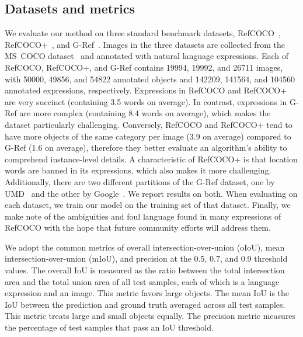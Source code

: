 \documentclass[10pt,twocolumn,letterpaper]{article}
\begin{document}
\subsection{Datasets and metrics}
\label{sec:datasets_and_metrics}
We evaluate our method on three standard benchmark datasets, RefCOCO~\cite{yu2016modeling}, RefCOCO+~\cite{yu2016modeling}, and G-Ref~\cite{mao2015generation,nagaraja16refexp}.
Images in the three datasets are collected from the MS~COCO dataset~\cite{lin2014mscoco} and annotated with natural language expressions.
Each of RefCOCO, RefCOCO+, and G-Ref contains \num{19994}, \num{19992}, and \num{26711} images, with \num{50000}, \num{49856}, and \num{54822} annotated objects and \num{142209}, \num{141564}, and \num{104560} annotated expressions, respectively.
Expressions in RefCOCO and RefCOCO+ are very succinct (containing 3.5 words on average).
In contrast, expressions in G-Ref are more complex (containing 8.4 words on average), which makes the dataset particularly challenging.
Conversely, RefCOCO and RefCOCO+ tend to have more objects of the same category per image (3.9 on average) compared to G-Ref (1.6 on average), therefore they better evaluate an algorithm's ability to comprehend instance-level details.
A characteristic of RefCOCO+ is that location words are banned in its expressions, which also makes it more challenging.
Additionally, there are two different partitions of the G-Ref dataset, one by UMD~\cite{nagaraja16refexp} and the other by Google~\cite{mao2015generation}.
We report results on both.
When evaluating on each dataset, we train our model on the training set of that dataset.
Finally, we make note of the ambiguities and foul language found in many expressions of RefCOCO with the hope that future community efforts will address them.

We adopt the common metrics of overall intersection-over-union (oIoU), mean intersection-over-union (mIoU), and precision at the 0.5, 0.7, and 0.9 threshold values.
The overall IoU is measured as the ratio between the total intersection area and the total union area of all test samples, each of which is a language expression and an image.
This metric favors large objects.
The mean IoU is the IoU between the prediction and ground truth averaged across all test samples.
This metric treats large and small objects equally.
The precision metric measures the percentage of test samples that pass an IoU threshold.
\end{document}
